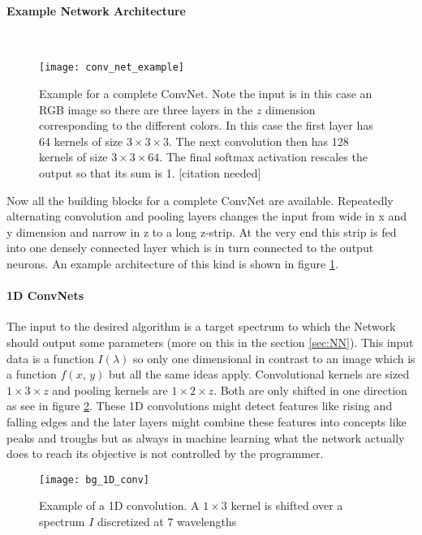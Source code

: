 \paragraph{Example Network Architecture}~\\
\begin{figure}[H]
    \centering
    \texttt{[image: conv\_net\_example]}
    \caption{Example for a complete ConvNet. Note the input is in this case an RGB image so there are three layers in the $z$ dimension corresponding to the different colors. In this case the first layer has 64 kernels of size $3 \times 3 \times 3$. The next convolution then has 128 kernels of size $3 \times 3 \times 64$. The final softmax activation rescales the output so that its sum is 1. [citation needed]}
    \label{fig:bg:NN_example}
\end{figure}

Now all the building blocks for a complete ConvNet are available. Repeatedly alternating convolution and pooling layers changes the input from wide in x and y dimension and narrow in z to a long z-strip. At the very end this strip is fed into one densely connected layer which is in turn connected to the output neurons. An example architecture of this kind is shown in figure \ref{fig:bg:NN_example}.



\paragraph{1D ConvNets}
The input to the desired algorithm is a target spectrum to which the Network should output some parameters (more on this in the section \ref{sec:NN}). This input data is a function $I(\lambda)$ so only one dimensional in contrast to an image which is a function $f(x, \, y)$ but all the same ideas apply. Convolutional kernels are sized $1 \times 3 \times z$ and pooling kernels are $1 \times 2 \times z$. Both are  only shifted in one direction as see in figure \ref{fig:bg:1D_conv}. These 1D convolutions might detect features like rising and falling edges and the later layers might combine these features into concepts like peaks and troughs but as always in machine learning what the network actually does to reach its objective is not controlled by the programmer.

\begin{figure}[H]
    \centering
    \texttt{[image: bg\_1D\_conv]}
    \caption{Example of a 1D convolution. A $1 \times 3$ kernel is shifted over a spectrum $I$ discretized at 7 wavelengths}
    \label{fig:bg:1D_conv}
\end{figure}
\vspace{1.5cm}


